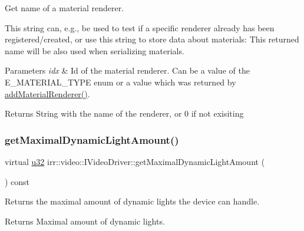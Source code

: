 Get name of a material renderer. 

This string can, e.\+g., be used to test if a specific renderer already has been registered/created, or use this string to store data about materials\+: This returned name will be also used when serializing materials. 
\begin{DoxyParams}{Parameters}
{\em idx} & Id of the material renderer. Can be a value of the E\+\_\+\+M\+A\+T\+E\+R\+I\+A\+L\+\_\+\+T\+Y\+PE enum or a value which was returned by \hyperlink{classirr_1_1video_1_1IVideoDriver_a0dfc3a7168f3a73a6f4323b579f03ff6}{add\+Material\+Renderer()}. \\
\hline
\end{DoxyParams}
\begin{DoxyReturn}{Returns}
String with the name of the renderer, or 0 if not exisiting 
\end{DoxyReturn}
\mbox{\label{classirr_1_1video_1_1IVideoDriver_ab64a2875011c8870fd011a486f3503ec}} 
\subsubsection{\texorpdfstring{get\+Maximal\+Dynamic\+Light\+Amount()}{getMaximalDynamicLightAmount()}\hspace{0.1cm}{\footnotesize\ttfamily [1/2]}}
{\footnotesize\ttfamily virtual \hyperlink{namespaceirr_a0416a53257075833e7002efd0a18e804}{u32} irr\+::video\+::\+I\+Video\+Driver\+::get\+Maximal\+Dynamic\+Light\+Amount (\begin{DoxyParamCaption}{ }\end{DoxyParamCaption}) const\hspace{0.3cm}{\ttfamily [pure virtual]}}



Returns the maximal amount of dynamic lights the device can handle. 

\begin{DoxyReturn}{Returns}
Maximal amount of dynamic lights. 
\end{DoxyReturn}
\mbox{\label{classirr_1_1video_1_1IVideoDriver_ab64a2875011c8870fd011a486f3503ec}} 
